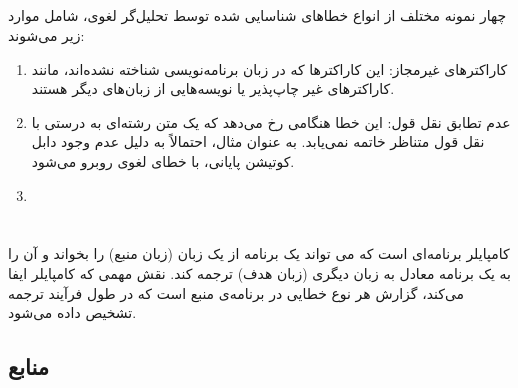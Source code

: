 \documentclass{article}
\begin{document}
\subsection{}
چهار نمونه مختلف از انواع خطاهای شناسایی شده توسط تحلیل‌گر لغوی، شامل موارد زیر می‌شوند:

\begin{enumerate}
\item کاراکترهای غیرمجاز: این کاراکترها که در زبان برنامه‌نویسی شناخته نشده‌اند، مانند کاراکترهای غیر چاپ‌پذیر یا نویسه‌هایی از زبان‌های دیگر هستند.
\item عدم تطابق نقل قول: این خطا هنگامی رخ می‌دهد که یک متن رشته‌ای به درستی با نقل قول متناظر خاتمه نمی‌یابد. به عنوان مثال،  احتمالاً به دلیل عدم وجود دابل کوتیشن پایانی، با خطای لغوی روبرو می‌شود.
\item
\end{enumerate}

\section{}%

کامپایلر برنامه‌ای است که می تواند یک برنامه از یک زبان (زبان منبع) را بخواند و آن را به یک برنامه معادل به زبان دیگری (زبان هدف) ترجمه کند. نقش مهمی که کامپایلر ایفا می‌کند، گزارش هر نوع خطایی در برنامه‌ی منبع است که در طول فرآیند ترجمه تشخیص داده می‌شود.












%





\subsection*{منابع}
\renewcommand{\subsection}[2]{}%
\begin{thebibliography}{99} %


\begin{LTRitems}

\resetlatinfont

\end{LTRitems}

\end{thebibliography}
\end{document}
